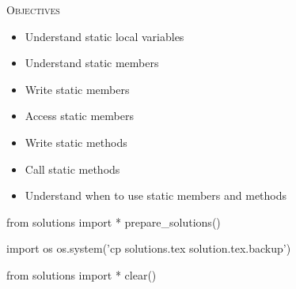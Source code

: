 
\textsc{Objectives}
\begin{itemize}
\item Understand static local variables
\item Understand static members
\item Write static members
\item Access static members
\item Write static methods
\item Call static methods
\item Understand when to use static members and methods
\end{itemize}











\begin{python0}
from solutions import *
prepare_solutions()
\end{python0}
\begin{python}
import os
os.system('cp solutions.tex solution.tex.backup')  
\end{python}

\begin{python0}
from solutions import *
clear()
\end{python0}
